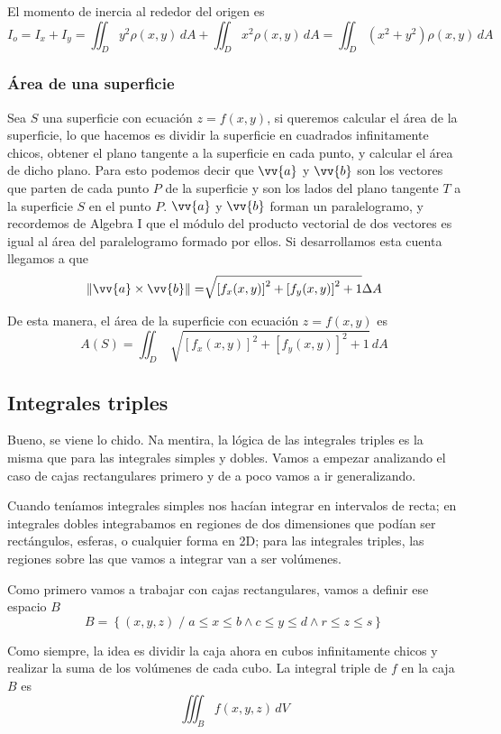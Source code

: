 \documentclass[12pt]{article}
\begin{document}
El momento de inercia al rededor del origen es 
\[
  I_{o}=I_{x}+I_{y}= \iint_{D} y^2\rho(x,y) \,dA + \iint_{D} x^2\rho(x,y) \,dA = \iint_{D} (x^2+y^2)\rho(x,y) \,dA
\]

\subsubsection{Área de una superficie}
Sea $ S $ una superficie con ecuación $ z=f(x,y) $, si queremos calcular el área de la superficie, lo que hacemos es dividir la superficie en cuadrados infinitamente chicos, obtener el plano tangente a la superficie en cada punto, y calcular el área de dicho plano. Para esto podemos decir que $ \vv{a} $ y $ \vv{b} $ son los vectores que parten de cada punto $ P $ de la superficie y son los lados del plano tangente $ T $ a la superficie $ S $ en el punto $ P $. $ \vv{a} $ y $ \vv{b} $ forman un paralelogramo, y recordemos de Algebra I que el módulo del producto vectorial de dos vectores es igual al área del paralelogramo formado por ellos. Si desarrollamos esta cuenta llegamos a que 
\[
  \lVert\vv{a}\times \vv{b}\rVert=\sqrt[]{\left[f_{x}(x,y)\right]^2+\left[f_{y}(x,y)\right]^2+1}\Delta A
\]

De esta manera, el área de la superficie con ecuación $ z=f(x,y) $ es
\[
  A(S)=\iint_{D} \sqrt[]{\left[f_{x}(x,y)\right]^2+\left[f_{y}(x,y)\right]^2+1} \,dA
\]

\subsection{Integrales triples}
Bueno, se viene lo chido. Na mentira, la lógica de las integrales triples es la misma que para las integrales simples y dobles. Vamos a empezar analizando el caso de cajas rectangulares primero y de a poco vamos a ir generalizando.

Cuando teníamos integrales simples nos hacían integrar en intervalos de recta; en integrales dobles integrabamos en regiones de dos dimensiones que podían ser rectángulos, esferas, o cualquier forma en 2D; para las integrales triples, las regiones sobre las que vamos a integrar van a ser volúmenes.

Como primero vamos a trabajar con cajas rectangulares, vamos a definir ese espacio $ B $
\[
  B=\left\{(x,y,z) \;/\; a\leq x\leq b \land c\leq y\leq d \land r\leq z\leq s\right\}
\]

Como siempre, la idea es dividir la caja ahora en cubos infinitamente chicos y realizar la suma de los volúmenes de cada cubo. La integral triple de $ f $ en la caja $ B $ es 
\[
  \iiint_{B} f(x,y,z) \,dV
\]
\end{document}
